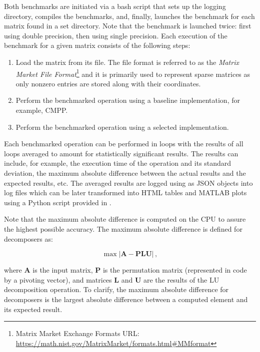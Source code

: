 Both benchmarks are initiated via a bash script that sets up the logging directory, compiles the benchmarks, and, finally, launches the benchmark for each matrix found in a set directory.
Note that the benchmark is launched twice: first using double precision, then using single precision.
Each execution of the benchmark for a given matrix consists of the following steps:

\begin{enumerate}
	\item Load the matrix from its  file.
The  file format is referred to as the \textit{Matrix Market File Format}\footnote{Matrix Market Exchange Formats URL: \url{https://math.nist.gov/MatrixMarket/formats.html\#MMformat}} and it is primarily used to represent sparse matrices as only nonzero entries are stored along with their coordinates.
	\item \label{Item:implementation->decomposition-project->benchmarks->procedure->baseline-operation}
		Perform the benchmarked operation using a baseline implementation, for example, CMPP.
	\item \label{Item:implementation->decomposition-project->benchmarks->procedure->selected-operations}
		Perform the benchmarked operation using a selected implementation.
\end{enumerate}

Each benchmarked operation can be performed in loops with the results of all loops averaged to amount for statistically significant results.
The results can include, for example, the execution time of the operation and its standard deviation, the maximum absolute difference between the actual results and the expected results, etc.
The averaged results are logged using  as JSON objects into log files which can be later transformed into HTML tables and MATLAB plots using a Python script provided in .

Note that the maximum absolute difference is computed on the CPU to assure the highest possible accuracy.
The maximum absolute difference is defined for decomposers as:

\begin{equation}
	\max \left| \mathbf{A} - \mathbf{PLU} \right| \,,
	\label{Equation:implementation->decomposition-project->benchmarks->decomposers->maximum-difference}
\end{equation}

where $\mathbf{A}$ is the input matrix, $\mathbf{P}$ is the permutation matrix (represented in code by a pivoting vector), and matrices $\mathbf{L}$ and $\mathbf{U}$ are the results of the LU decomposition operation.
To clarify, the maximum absolute difference for decomposers is the largest absolute difference between a computed element and its expected result.

